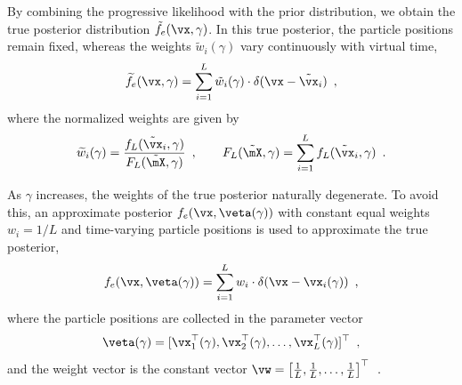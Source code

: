 By combining the progressive likelihood with the prior distribution, we obtain the true posterior distribution $\tilde{f}_e(\vx,\gamma)$. In this true posterior, the particle positions remain fixed, whereas the weights $\tilde{w}_i(\gamma)$ vary continuously with virtual time,
\begin{equation}
	\widetilde{f}_e(\vx, \gamma) = \sum_{i=1}^L \tilde{w}_i(\gamma) \cdot \delta(\vx - \tilde{\vx}_i) \enspace,
\end{equation}
where the normalized weights are given by
\begin{equation}
	\widetilde{w}_i(\gamma) = \frac{f_L(\tilde{\vx}_i, \gamma)}{F_L(\tilde{\mX}, \gamma)}\enspace, \qquad F_L(\tilde{\mX}, \gamma) = \sum_{i=1}^L f_L(\tilde{\vx}_i, \gamma) \enspace.
\end{equation}

As $\gamma$ increases, the weights of the true posterior naturally degenerate. To avoid this, an approximate posterior $f_e(\vx, \veta(\gamma))$ with constant equal weights $w_i = 1/L$ and time-varying particle positions is used to approximate the true posterior,
\begin{equation}
	f_e(\vx,\veta(\gamma)) = \sum_{i=1}^L w_i \cdot \delta(\vx - \vx_i(\gamma)) \enspace,
\end{equation}
where the particle positions are collected in the parameter vector
\begin{equation}
	\veta(\gamma) = [\vx_1^{\top}(\gamma), \vx_2^{\top}(\gamma), \dots, \vx_L^{\top}(\gamma)]^{\top} \enspace,
\end{equation}
and the weight vector is the constant vector $\vw = \left[ \frac{1}{L}, \frac{1}{L}, \dots, \frac{1}{L} \right]^\top \enspace.$

